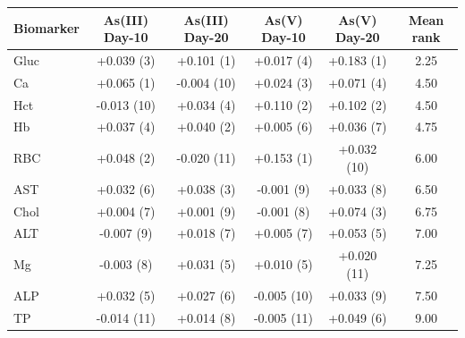 \begin{tabular}{lccccc}
  \toprule
  Biomarker & As(III) Day-10 & As(III) Day-20 & As(V) Day-10 & As(V) Day-20 & Mean rank \\
  \midrule
  Gluc & +0.039 (3) & +0.101 (1) & +0.017 (4) & +0.183 (1) & 2.25 \\
  Ca & +0.065 (1) & -0.004 (10) & +0.024 (3) & +0.071 (4) & 4.50 \\
  Hct & -0.013 (10) & +0.034 (4) & +0.110 (2) & +0.102 (2) & 4.50 \\
  Hb & +0.037 (4) & +0.040 (2) & +0.005 (6) & +0.036 (7) & 4.75 \\
  RBC & +0.048 (2) & -0.020 (11) & +0.153 (1) & +0.032 (10) & 6.00 \\
  AST & +0.032 (6) & +0.038 (3) & -0.001 (9) & +0.033 (8) & 6.50 \\
  Chol & +0.004 (7) & +0.001 (9) & -0.001 (8) & +0.074 (3) & 6.75 \\
  ALT & -0.007 (9) & +0.018 (7) & +0.005 (7) & +0.053 (5) & 7.00 \\
  Mg & -0.003 (8) & +0.031 (5) & +0.010 (5) & +0.020 (11) & 7.25 \\
  ALP & +0.032 (5) & +0.027 (6) & -0.005 (10) & +0.033 (9) & 7.50 \\
  TP & -0.014 (11) & +0.014 (8) & -0.005 (11) & +0.049 (6) & 9.00 \\
  \bottomrule
\end{tabular}
